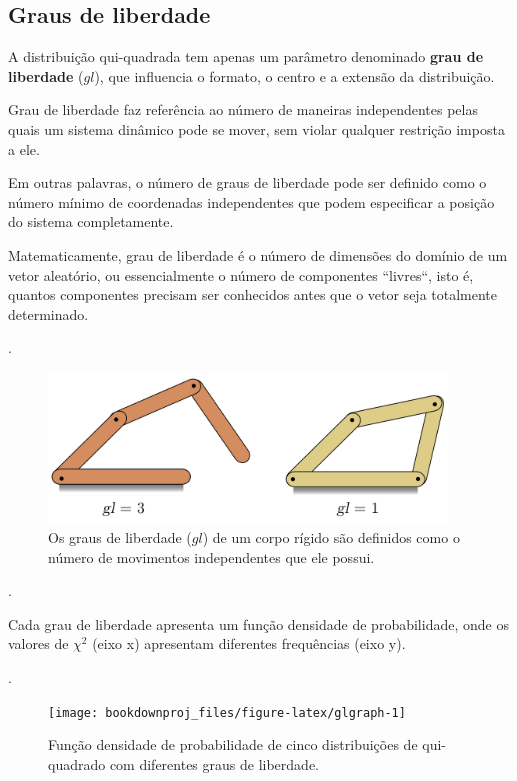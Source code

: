 \documentclass[
]{book}
\begin{document}
\hypertarget{graus-de-liberdade}{%
\subsection{Graus de liberdade}\label{graus-de-liberdade}}

A distribuição qui-quadrada tem apenas um parâmetro denominado \textbf{grau de liberdade} (\(gl\)), que influencia o formato, o centro e a extensão da distribuição.

Grau de liberdade faz referência ao número de maneiras independentes pelas quais um sistema dinâmico pode se mover, sem violar qualquer restrição imposta a ele.

Em outras palavras, o número de graus de liberdade pode ser definido como o número mínimo de coordenadas independentes que podem especificar a posição do sistema completamente.

Matematicamente, grau de liberdade é o número de dimensões do domínio de um vetor aleatório, ou essencialmente o número de componentes ``livres``, isto é, quantos componentes precisam ser conhecidos antes que o vetor seja totalmente determinado.

.\linebreak

\begin{figure}

{\centering \includegraphics[width=400px]{figs/gl_mecanismo} 

}

\caption{Os graus de liberdade ($gl$) de um corpo rígido são definidos como o número de movimentos independentes que ele possui.}\label{fig:gl}
\end{figure}

.\linebreak

Cada grau de liberdade apresenta um função densidade de probabilidade, onde os valores de \(\chi^2\) (eixo x) apresentam diferentes frequências (eixo y).

.\linebreak

\begin{figure}

{\centering \texttt{[image: bookdownproj\_files/figure-latex/glgraph-1]} 

}

\caption{Função densidade de probabilidade de cinco distribuições de qui-quadrado com diferentes graus de liberdade.}\label{fig:glgraph}
\end{figure}
\end{document}
